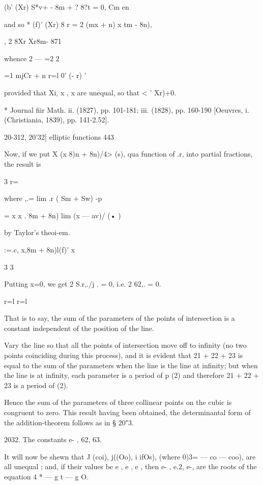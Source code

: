 {(b' (Xr) S*v+ - 8m + ? 8?t = 0, Cm en

and so * (f)' (Xr) 8 r = 2 (mx + n) x tm - 8n),

, 2 8Xr Xr8m- 871

whence 2 — =2 2



=1 mjCr + n r=l 0' (- r) '

provided that Xi, x , x are unequal, so that < ' Xr)+0.

* Journal fiir Math. ii. (1827), pp. 101-181; iii. (1828), pp. 160-190
[Oeuvres, i. (Christiania, 1839), pp. 141-2.52].



20-312, 20'32] elliptic functions 443

Now, if we put X (x 8)n + 8n)/4> (s), qua function of .r, into partial
fractions, the result is

3 r=\

where ,.= lim .r ( Sm + Sw) -p

= x x . 8m + 8n) lim (x — av)/ (• )



by Taylor's theoi-em.



:=.c, x,8m + 8n)l(f)' x \



3 3

Putting x=0, we get 2 S.r,./j . = 0, i.e. 2 62,. = 0.

r=l r=l

That is to say, the sum of the parameters of the points of
intersection is a constant independent of the position of the line.

Vary the line so that all the points of intersection move off to
infinity (no two points coinciding during this process), and it is
evident that 21 + 22 + 23 is equal to the sum of the parameters when
the line is the line at infinity; but when the line is at infinity,
each parameter is a period of p (2) and therefore 21 + 22 + 23 is a
period of (2).

Hence the sum of the parameters of three collinear points on the cubic
is congruent to zero. This result having been obtained, the
determinantal form of the addition-theorem follows as in § 20"3.

2032. The constants e- , 62, 63.

It will now be shewn that J (coi), j((Oo), i ifOs), (where 0)3= — co —
coo), are all unequal ; and, if their values be e , e , e , then e- ,
e.2, e-, are the roots of the equation 4 * — g t — g O.

}
